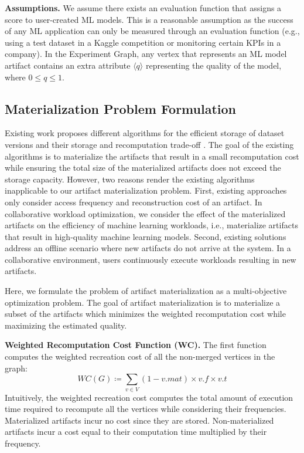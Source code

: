\textbf{Assumptions. }
We assume there exists an evaluation function that assigns a score to user-created ML models.
This is a reasonable assumption as the success of any ML application can only be measured through an evaluation function (e.g., using a test dataset in a Kaggle competition or monitoring certain KPIs in a company).
In the Experiment Graph, any vertex that represents an ML model artifact contains an extra attribute $\langle q \rangle$ representing the quality of the model, where $0 \leq q \leq 1$.

\subsection{Materialization Problem Formulation}\label{subsec-materialization-problem}
Existing work proposes different algorithms for the efficient storage of dataset versions and their storage and recomputation trade-off \cite{bhattacherjee2015principles}.
The goal of the existing algorithms is to materialize the artifacts that result in a small recomputation cost while ensuring the total size of the materialized artifacts does not exceed the storage capacity.
However, two reasons render the existing algorithms inapplicable to our artifact materialization problem.
First, existing approaches only consider access frequency and reconstruction cost of an artifact.
In collaborative workload optimization, we consider the effect of the materialized artifacts on the efficiency of machine learning workloads, i.e., materialize artifacts that result in high-quality machine learning models.
Second, existing solutions address an offline scenario where new artifacts do not arrive at the system.
In a collaborative environment, users continuously execute workloads resulting in new artifacts.

Here, we formulate the problem of artifact materialization as a multi-objective optimization problem.
The goal of artifact materialization is to materialize a subset of the artifacts which minimizes the weighted recomputation cost while maximizing the estimated quality.

\textbf{Weighted Recomputation Cost Function (WC).} 
The first function computes the weighted recreation cost of all the non-merged vertices in the graph:
\[
WC(G) \coloneqq   \sum\limits_{v \in V}  (1-v.mat) \times v.f \times v.t
\]
Intuitively, the weighted recreation cost computes the total amount of execution time required to recompute all the vertices while considering their frequencies.
Materialized artifacts incur no cost since they are stored.
Non-materialized artifacts incur a cost equal to their computation time multiplied by their frequency.

